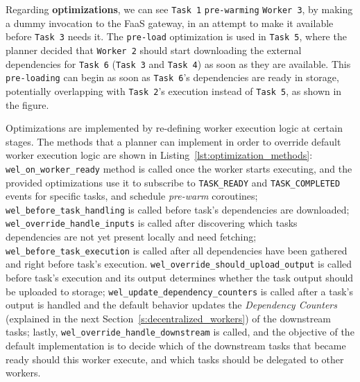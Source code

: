 Regarding \textbf{optimizations}, we can see \texttt{Task 1} \texttt{pre-warming} \texttt{Worker 3}, by making  a dummy invocation to the FaaS gateway, in an attempt to make it available before \texttt{Task 3} needs it. The \texttt{pre-load} optimization is used in \texttt{Task 5}, where the planner decided that \texttt{Worker 2} should start downloading the external dependencies for \texttt{Task 6} (\texttt{Task 3} and \texttt{Task 4}) as soon as they are available. This \texttt{pre-loading} can begin as soon as \texttt{Task 6}'s dependencies are ready in storage, potentially overlapping with \texttt{Task 2}'s execution instead of \texttt{Task 5}, as shown in the figure.

Optimizations are implemented by re-defining worker execution logic at certain stages. The methods that a planner can implement in order to override default worker execution logic are shown in Listing~\ref{lst:optimization_methods}: \texttt{wel\_on\_worker\_ready} method is called once the worker starts executing, and the provided optimizations use it to subscribe to \texttt{TASK\_READY} and \texttt{TASK\_COMPLETED} events for specific tasks, and schedule \textit{pre-warm} coroutines; \texttt{wel\_before\_task\_handling} is called before task's dependencies are downloaded; \texttt{wel\_override\_handle\_inputs} is called after discovering which tasks dependencies are not yet present locally and need fetching; \texttt{wel\_before\_task\_execution} is called after all dependencies have been gathered and right before task's execution. \texttt{wel\_override\_should\_upload\_output} is called before task's execution and its output determines whether the task output should be uploaded to storage; \texttt{wel\_update\_dependency\_counters} is called after a task's output is handled and the default behavior updates the \textit{Dependency Counters} (explained in the next Section~\ref{s:decentralized_workers}) of the downstream tasks; lastly, \texttt{wel\_override\_handle\_downstream} is called, and the objective of the default implementation is to decide which of the downstream tasks that became ready should this worker execute, and which tasks should be delegated to other workers.

